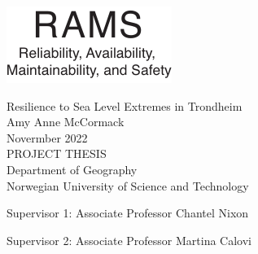 


\thispagestyle{empty}
\includegraphics[scale=1.1]{fig/rams}
\mbox{}\\[6pc]
\begin{center}
\Huge{Resilience to Sea Level Extremes in Trondheim}\\[2pc]

\Large{Amy Anne McCormack}\\[1pc]
\large{Novermber 2022}\\[2pc]

PROJECT THESIS\\
Department of Geography\\
Norwegian University of Science and Technology
\end{center}
\vfill

\noindent Supervisor 1: Associate Professor Chantel Nixon

\noindent Supervisor 2: Associate Professor Martina Calovi


